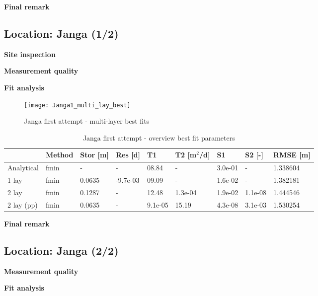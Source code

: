 \textbf{Final remark}


\subsection{Location: Janga (1/2)}

\textbf{Site inspection}

\textbf{Measurement quality}

\textbf{Fit analysis}

\begin{figure}[h!]
 \centering
 \texttt{[image: Janga1\_multi\_lay\_best]}
 \captionsetup{justification=centering} 
 \caption{Janga first attempt - multi-layer best fits}
 \label{fig:Janga1_best}
\end{figure}

\begin{table}[h!]
\small
\centering
\caption{Janga first attempt - overview best fit parameters}
\label{tab:Janga1_table}
\begin{tabular}{l|l|l|l|ll|ll|l}
\hline 
\textbf{}       & \textbf{Method} & \textbf{Stor [m]} & \textbf{Res [d]} & \textbf{T1}  & \textbf{T2   [m$^2$/d]}  & \textbf{S1}  & \textbf{S2 [-]}  & \textbf{RMSE [m]} \\ \hline \hline
Analytical                & fmin             & -             & -            & 08.84      & -          & 3.0e-01    & -          & 1.338604 \\
1 lay                     & fmin             & 0.0635        & -9.7e-03     & 09.09      & -          & 1.6e-02    & -          & 1.382181 \\
2 lay                     & fmin             & 0.1287        & -            & 12.48      & 1.3e-04    & 1.9e-02    & 1.1e-08    & 1.444546 \\
2 lay (pp)                & fmin             & 0.0635        & -            & 9.1e-05    & 15.19      & 4.3e-08    & 3.1e-03    & 1.530254 \\ \hline    
\end{tabular}
\end{table}

\textbf{Final remark}

\subsection{Location: Janga (2/2)}

\textbf{Measurement quality}

\textbf{Fit analysis}

